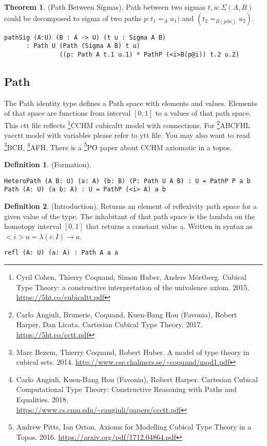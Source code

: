 \documentclass{article}
\theoremstyle{definition}
\newtheorem{definition}{Definition}
\newtheorem{theorem}{Theorem}
\begin{document}
\begin{theorem} (Path Between Sigmas).
Path between two sigmas $t,u: \Sigma(A,B)$ could be decomposed to
sigma of two paths $p:t_1=_{A}u_1)$ and $(t_2=_{B(p@i)}u_2)$.
\begin{lstlisting}
pathSig (A:U) (B : A -> U) (t u : Sigma A B)
      : Path U (Path (Sigma A B) t u)
               ((p: Path A t.1 u.1) * PathP (<i>B(p@i)) t.2 u.2)
\end{lstlisting}
\end{theorem}

\newpage
\subsection{Path}

The Path identity type defines a Path space with elements and values.
Elements of that space are functions from interval $[0,1]$ to a values of that path space.
This ctt file reflects \footnote{Cyril Cohen, Thierry Coquand, Simon Huber, Anders M{\"{o}}rtberg. Cubical Type Theory: a constructive interpretation of the univalence axiom. 2015. \url{https://5ht.co/cubicaltt.pdf}}{CCHM} cubicaltt model with connections.
For \footnote{Carlo Angiuli, Brunerie, Coquand, Kuen-Bang Hou (Favonia), Robert Harper, Dan Licata. Cartesian Cubical Type Theory. 2017. \url{https://5ht.co/cctt.pdf}}{ABCFHL} yacctt model with
variables please refer to ytt file. You may also want to
read \footnote{Marc Bezem, Thierry Coquand, Robert Huber. A model of type theory in cubical sets. 2014. \url{http://www.cse.chalmers.se/~coquand/mod1.pdf}}{BCH},
\footnote{Carlo Angiuli, Kuen-Bang Hou (Favonia), Robert Harper. Cartesian Cubical Computational Type Theory: Constructive Reasoning with Paths and Equalities. 2018. \\ \url{https://www.cs.cmu.edu/~cangiuli/papers/ccctt.pdf}}{AFH}.
There is a \footnote{Andrew Pitts, Ian Orton. Axioms for Modelling Cubical Type Theory in a Topos. 2016. \url{https://arxiv.org/pdf/1712.04864.pdf}}{PO} paper about CCHM axiomatic in a topos.

\begin{definition} (Formation).
\begin{lstlisting}
HeteroPath (A B: U) (a: A) (b: B) (P: Path U A B) : U = PathP P a b
Path (A: U) (a b: A) : U = PathP (<i> A) a b
\end{lstlisting}
\end{definition}

\begin{definition} (Introduction).
Returns an element of reflexivity path space for a given value of the type.
The inhabitant of that path space is the lambda on the homotopy
interval $[0,1]$ that returns a constant value a. Written in
syntax as $<i>a = \lambda(i:I)\rightarrow a$.
\begin{lstlisting}
refl (A: U) (a: A) : Path A a a
\end{lstlisting}
\end{definition}
\end{document}

